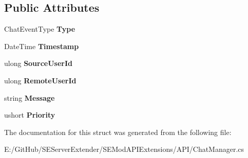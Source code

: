 \subsection*{Public Attributes}
\begin{DoxyCompactItemize}
\item 
\hypertarget{struct_s_e_mod_a_p_i_extensions_1_1_a_p_i_1_1_chat_manager_1_1_chat_event_a7d47786e2350e6d25c632d8596302db7}{}Chat\+Event\+Type {\bfseries Type}\label{struct_s_e_mod_a_p_i_extensions_1_1_a_p_i_1_1_chat_manager_1_1_chat_event_a7d47786e2350e6d25c632d8596302db7}

\item 
\hypertarget{struct_s_e_mod_a_p_i_extensions_1_1_a_p_i_1_1_chat_manager_1_1_chat_event_a360a707a452a44b46f6386c84cc18b40}{}Date\+Time {\bfseries Timestamp}\label{struct_s_e_mod_a_p_i_extensions_1_1_a_p_i_1_1_chat_manager_1_1_chat_event_a360a707a452a44b46f6386c84cc18b40}

\item 
\hypertarget{struct_s_e_mod_a_p_i_extensions_1_1_a_p_i_1_1_chat_manager_1_1_chat_event_a752ee81d95ebeb599a4555e4a63d64e3}{}ulong {\bfseries Source\+User\+Id}\label{struct_s_e_mod_a_p_i_extensions_1_1_a_p_i_1_1_chat_manager_1_1_chat_event_a752ee81d95ebeb599a4555e4a63d64e3}

\item 
\hypertarget{struct_s_e_mod_a_p_i_extensions_1_1_a_p_i_1_1_chat_manager_1_1_chat_event_aa7fc3d8819ff5c55f8e9b9784489d5b2}{}ulong {\bfseries Remote\+User\+Id}\label{struct_s_e_mod_a_p_i_extensions_1_1_a_p_i_1_1_chat_manager_1_1_chat_event_aa7fc3d8819ff5c55f8e9b9784489d5b2}

\item 
\hypertarget{struct_s_e_mod_a_p_i_extensions_1_1_a_p_i_1_1_chat_manager_1_1_chat_event_a2a805ab6ecfc941f51399b64974bb271}{}string {\bfseries Message}\label{struct_s_e_mod_a_p_i_extensions_1_1_a_p_i_1_1_chat_manager_1_1_chat_event_a2a805ab6ecfc941f51399b64974bb271}

\item 
\hypertarget{struct_s_e_mod_a_p_i_extensions_1_1_a_p_i_1_1_chat_manager_1_1_chat_event_a8004b58024c46859c4cf8a9e14bbfa58}{}ushort {\bfseries Priority}\label{struct_s_e_mod_a_p_i_extensions_1_1_a_p_i_1_1_chat_manager_1_1_chat_event_a8004b58024c46859c4cf8a9e14bbfa58}

\end{DoxyCompactItemize}


The documentation for this struct was generated from the following file\+:\begin{DoxyCompactItemize}
\item 
E\+:/\+Git\+Hub/\+S\+E\+Server\+Extender/\+S\+E\+Mod\+A\+P\+I\+Extensions/\+A\+P\+I/Chat\+Manager.\+cs\end{DoxyCompactItemize}
